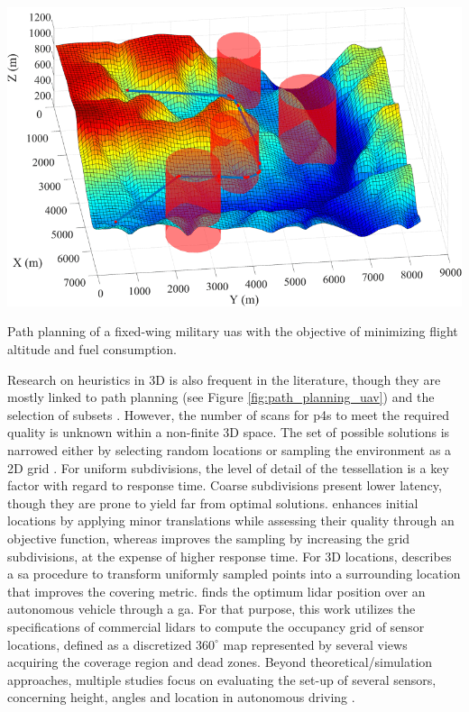\begin{marginfigure}[3.0cm]
	\includegraphics{figs/context/uav_path_planning.png}
	\caption{Path planning of a fixed-wing military \acrshort{uas} with the objective of minimizing flight altitude and fuel consumption.}
	\label{fig:path_planning_uav}
\end{marginfigure}
Research on heuristics in 3D is also frequent in the literature, though they are mostly linked to path planning \cite{pehlivanoglu_enhanced_2021, roberge_parallel_2021} (see Figure \ref{fig:path_planning_uav}) and the selection of subsets \cite{pehlivanoglu_enhanced_2021}. However, the number of scans for \acrshort{p4s} to meet the required quality is unknown within a non-finite 3D space. The set of possible solutions is narrowed either by selecting random locations \cite{chen_indoor_2018} or sampling the environment as a 2D grid \cite{starek_viewshed_2020, giorgini_sensor-based_2019, jia_comparison_2017}. For uniform subdivisions, the level of detail of the tessellation is a key factor with regard to response time. Coarse subdivisions present lower latency, though they are prone to yield far from optimal solutions. \cite{starek_viewshed_2020} enhances initial locations by applying minor translations while assessing their quality through an objective function, whereas \cite{soudarissanane_optimizing_2012} improves the sampling by increasing the grid subdivisions, at the expense of higher response time. For 3D locations, \cite{starek_viewshed_2020} describes a \acrshort{sa} procedure to transform uniformly sampled points into a surrounding location that improves the covering metric. \cite{kim_placement_2020} finds the optimum \acrshort{lidar} position over an autonomous vehicle through a \acrshort{ga}. For that purpose, this work utilizes the specifications of commercial \acrshort{lidar}s to compute the occupancy grid of sensor locations, defined as a discretized $360^\circ$ map represented by several views acquiring the coverage region and dead zones. Beyond theoretical/simulation approaches, multiple studies focus on evaluating the set-up of several sensors, concerning height, angles and location in autonomous driving \cite{pereira_self_2016, veronese_accurate_2018}. 

